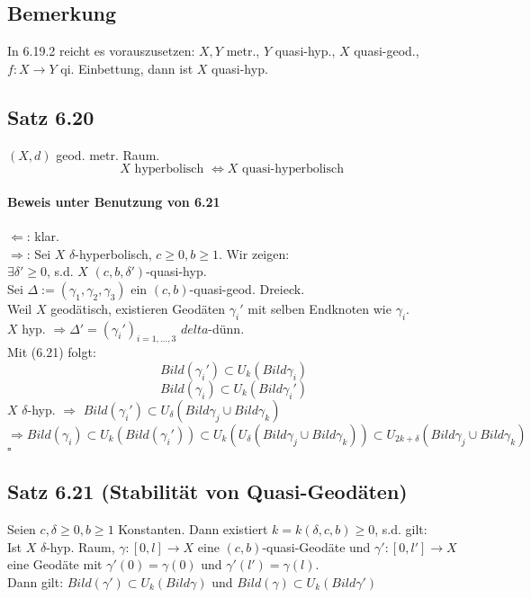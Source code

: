 \documentclass{article}
\newcommand{\qed}{\hfill $\square$}
\begin{document}
\subsection{Bemerkung}
In 6.19.2 reicht es vorauszusetzen: $X,Y$ metr., $Y$ quasi-hyp., $X$ quasi-geod., $f: X \rightarrow Y$ qi. Einbettung, dann ist $X$ quasi-hyp.

\subsection{Satz 6.20}
$(X,d)$ geod. metr. Raum.
\[X \text{ hyperbolisch } \Longleftrightarrow X \text{ quasi-hyperbolisch }  \]

\paragraph{Beweis unter Benutzung von 6.21}
$\Longleftarrow$: klar.\\
$\Longrightarrow$: Sei $X$ $\delta$-hyperbolisch, $c \geq 0,b \geq 1$. Wir zeigen:\\
$\exists \delta' \geq 0$, s.d. $X$ $(c,b,\delta')$-quasi-hyp.\\
Sei $\Delta := (\gamma_1, \gamma_2, \gamma_3)$ ein $(c,b)$-quasi-geod. Dreieck.\\
Weil $X$ geodätisch, existieren Geodäten $\gamma_i'$ mit selben Endknoten wie $\gamma_i$.\\
$X$ hyp. $\Longrightarrow \Delta' =(\gamma_i')_{i = 1,\ldots, 3}$ $delta$-dünn.\\
Mit (6.21) folgt:
\[Bild(\gamma_i') \subset U_k(Bild \gamma_i) \]
\[Bild(\gamma_i) \subset U_k(Bild \gamma_i') \]
$X$ $\delta$-hyp. $\Longrightarrow$ $Bild(\gamma_i') \subset U_\delta(Bild \gamma_j \cup Bild \gamma_k)$\\
$\Longrightarrow Bild(\gamma_i) \subset U_k(Bild(\gamma_i')) \subset  U_k(U_\delta (Bild\gamma_j \cup Bild \gamma_k)) \subset U_{2k + \delta}(Bild\gamma_j \cup Bild \gamma_k)$\qed


\subsection{Satz 6.21 (Stabilität von Quasi-Geodäten)}
Seien $c,\delta \geq 0, b \geq 1$ Konstanten. Dann existiert $k = k(\delta, c,b) \geq 0$, s.d. gilt:\\
Ist $X$ $\delta$-hyp. Raum, $\gamma : [0,l] \rightarrow X$ eine $(c,b)$-quasi-Geodäte und $\gamma' : [0,l'] \rightarrow X$ eine Geodäte mit $\gamma'(0) = \gamma(0)$ und $\gamma'(l') = \gamma(l)$.\\
Dann gilt: $Bild(\gamma') \subset U_k(Bild \gamma)$ und $Bild(\gamma) \subset U_k(Bild \gamma')$
\end{document}
